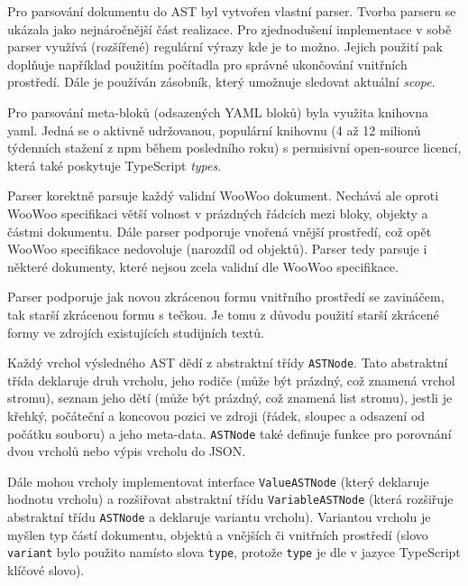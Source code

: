 Pro parsování dokumentu do AST byl vytvořen vlastní parser. Tvorba parseru se ukázala jako nejnáročnější část realizace.
Pro zjednodušení implementace v sobě parser využívá (rozšířené) regulární výrazy kde je to možno. Jejich použití pak
doplňuje například použitím počítadla pro správné ukončování vnitřních prostředí. Dále je používán zásobník, který
umožnuje sledovat aktuální \textit{scope}.

\begin{sloppypar}
Pro parsování meta-bloků (odsazených YAML bloků) byla využita knihovna yaml. Jedná se o aktivně udržovanou, populární
knihovnu (4 až 12 milionů týdenních stažení z npm \cite{npm} během posledního roku) s permisivní open-source licencí,
která také poskytuje TypeScript \textit{types}.
\end{sloppypar}

Parser korektně parsuje každý validní WooWoo dokument. Nechává ale oproti WooWoo specifikaci větší volnost v prázdných
řádcích mezi bloky, objekty a částmi dokumentu. Dále parser podporuje vnořená vnější prostředí, což opět WooWoo
specifikace \cite{woowoo} nedovoluje (narozdíl od objektů). Parser tedy parsuje i některé dokumenty, které nejsou zcela
validní dle WooWoo specifikace.

Parser podporuje jak novou zkrácenou formu vnitřního prostředí se zavináčem, tak starší zkrácenou formu s tečkou. Je
tomu z důvodu použití starší zkrácené formy ve zdrojích existujících studijních textů.

Každý vrchol výsledného AST dědí z abstraktní třídy \texttt{ASTNode}. Tato abstraktní třída deklaruje druh
vrcholu, jeho rodiče (může být prázdný, což znamená vrchol stromu), seznam jeho dětí (může být prázdný, což znamená list
stromu), jestli je křehký, počáteční a koncovou pozici ve zdroji (řádek, sloupec a odsazení od počátku souboru) a jeho
meta-data. \texttt{ASTNode} také definuje funkce pro porovnání dvou vrcholů nebo výpis vrcholu do JSON.

Dále mohou vrcholy implementovat interface \texttt{ValueASTNode} (který deklaruje hodnotu vrcholu) a
rozšiřovat abstraktní třídu \texttt{VariableASTNode} (která rozšiřuje abstraktní třídu \texttt
{ASTNode} a deklaruje variantu vrcholu). Variantou vrcholu je myšlen typ částí dokumentu, objektů a vnějších či
vnitřních prostředí (slovo \texttt{variant} bylo použito namísto slova \texttt{type}, protože
\texttt{type} je dle \cite{ts-docs} v jazyce TypeScript klíčové slovo).
